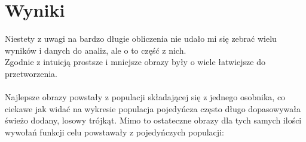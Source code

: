\documentclass{article}
\begin{document}
\section{Wyniki}
Niestety z uwagi na bardzo długie obliczenia nie udało mi się zebrać wielu wyników i danych do analiz, ale o to część z nich.\\
Zgodnie z intuicją prostsze i mniejsze obrazy były o wiele łatwiejsze do przetworzenia.\\\\
Najlepsze obrazy powstały z populacji składającej się z jednego osobnika, co ciekawe jak widać na wykresie populacja pojedyńcza często długo dopasowywała świeżo dodany, losowy trójkąt. Mimo to ostateczne obrazy dla tych samych ilości wywołań funkcji celu powstawały z pojedyńczych populacji:
\begin{figure}[b!]
  \centering
  \hfill
\end{figure}
\\\\\\
\end{document}
